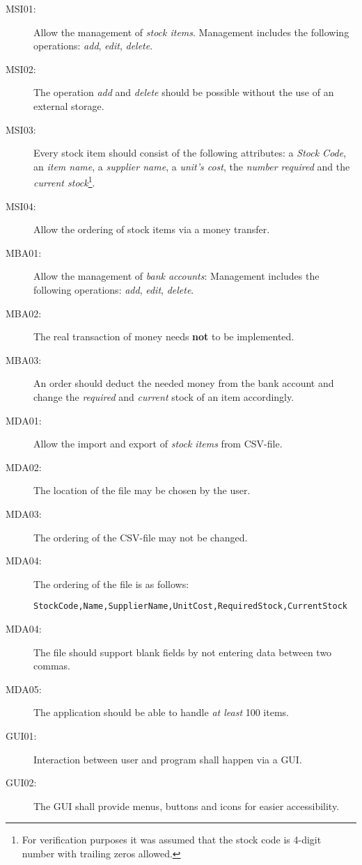 \begin{description}
\item[MSI01:] Allow the management of \textit{stock items}. Management includes the following operations: \textit{add}, \textit{edit}, \textit{delete}.
\item[MSI02:] The operation \textit{add} and \textit{delete} should be possible without the use of an external storage.
\item[MSI03:] Every stock item should consist of the following attributes: a \textit{Stock Code}, an \textit{item name}, a \textit{supplier name}, a \textit{unit's cost}, the \textit{number required} and the \textit{current stock}\footnote{For verification purposes it was assumed that the stock code is 4-digit number with trailing zeros allowed.}.
\item[MSI04:] Allow the ordering of stock items via a money transfer.
\item[MBA01:] Allow the management of \textit{bank accounts}: Management includes the following operations: \textit{add}, \textit{edit}, \textit{delete}.
\item[MBA02:] The real transaction of money needs \textbf{not} to be implemented.
\item[MBA03:] An order should deduct the needed money from the bank account and change the \textit{required} and \textit{current} stock of an item accordingly.
\item[MDA01:] Allow the import and export of \textit{stock items} from \ac{CSV}-file.
\item[MDA02:] The location of the file may be chosen by the user.
\item[MDA03:] The ordering of the \ac{CSV}-file may not be changed.
\item[MDA04:] The ordering of the file is as follows:
\begin{lstlisting}
StockCode,Name,SupplierName,UnitCost,RequiredStock,CurrentStock
\end{lstlisting}
\item[MDA04:] The file should support blank fields by not entering data between two commas.
\item[MDA05:] The application should be able to handle \textit{at least} 100 items.
\item[GUI01:] Interaction between user and program shall happen via a \ac{GUI}.
\item[GUI02:] The \ac{GUI} shall provide menus, buttons and icons for easier accessibility.
\end{description}
